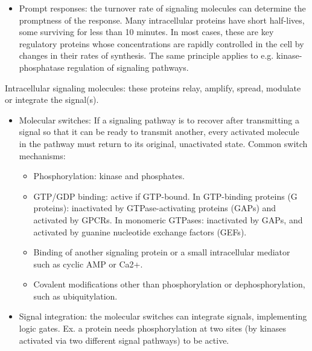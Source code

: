 \documentclass{report}
\begin{document}
\begin{enumerate}
\begin{itemize}
\begin{itemize}
\item Prompt responses: the turnover rate of signaling molecules can determine the promptness of the response. Many intracellular proteins have short half-lives, some surviving for less than 10 minutes. In most cases, these are key regulatory proteins whose concentrations are rapidly controlled in the cell by changes in their rates of synthesis. The same principle applies to e.g. kinase-phosphatase regulation of signaling pathways. 
\end{itemize}
\end{itemize}

Intracellular signaling molecules: these proteins relay, amplify, spread, modulate or integrate the signal(s). 
\begin{itemize}
\item Molecular switches: If a signaling pathway is to recover after transmitting a signal so that it can be ready to transmit another, every activated molecule in the pathway must return to its original, unactivated state. Common switch mechanisms:
\begin{itemize}
	\item Phosphorylation: kinase and phosphates. 
	\item GTP/GDP binding: active if GTP-bound. In GTP-binding proteins (G proteins): inactivated by GTPase-activating proteins (GAPs) and activated by GPCRs. In monomeric GTPases: inactivated by GAPs, and activated by guanine nucleotide exchange factors (GEFs). 
	\item Binding of another signaling protein or a small intracellular mediator such as cyclic AMP or Ca2+. 
	\item Covalent modifications other than phosphorylation or dephosphorylation, such as ubiquitylation.
\end{itemize}

\item Signal integration: the molecular switches can integrate signals, implementing logic gates. Ex. a protein needs phosphorylation at two sites (by kinases activated via two different signal pathways) to be active.


\end{itemize}
\end{enumerate}
\end{document}
